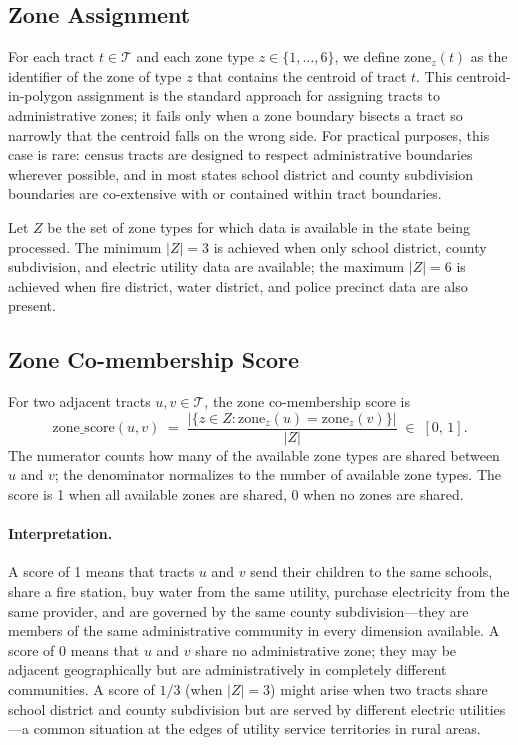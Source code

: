 \label{sec:formula}

\subsection{Zone Assignment}

For each tract $t \in \mathcal{T}$ and each zone type $z \in \{1, \ldots, 6\}$,
we define $\mathrm{zone}_z(t)$ as the identifier of the zone of type $z$ that
contains the centroid of tract $t$.
This centroid-in-polygon assignment is the standard approach for assigning
tracts to administrative zones; it fails only when a zone boundary bisects a
tract so narrowly that the centroid falls on the wrong side.
For practical purposes, this case is rare: census tracts are designed to respect
administrative boundaries wherever possible, and in most states school district
and county subdivision boundaries are co-extensive with or contained within
tract boundaries.

Let $Z$ be the set of zone types for which data is available in the state being
processed.
The minimum $|Z| = 3$ is achieved when only school district, county subdivision,
and electric utility data are available; the maximum $|Z| = 6$ is achieved when
fire district, water district, and police precinct data are also present.

\subsection{Zone Co-membership Score}

For two adjacent tracts $u, v \in \mathcal{T}$, the zone co-membership score is
\begin{equation}
  \mathrm{zone\_score}(u,v)
  \;=\;
  \frac{|\{z \in Z : \mathrm{zone}_z(u) = \mathrm{zone}_z(v)\}|}{|Z|}
  \;\in\; [0,\, 1].
  \label{eq:zone-score}
\end{equation}
The numerator counts how many of the available zone types are shared between $u$
and $v$; the denominator normalizes to the number of available zone types.
The score is 1 when all available zones are shared, 0 when no zones are shared.

\paragraph{Interpretation.}
A score of 1 means that tracts $u$ and $v$ send their children to the same schools,
share a fire station, buy water from the same utility, purchase electricity from the
same provider, and are governed by the same county subdivision---they are members
of the same administrative community in every dimension available.
A score of 0 means that $u$ and $v$ share no administrative zone; they may be
adjacent geographically but are administratively in completely different communities.
A score of $1/3$ (when $|Z| = 3$) might arise when two tracts share school district
and county subdivision but are served by different electric utilities---a common
situation at the edges of utility service territories in rural areas.

